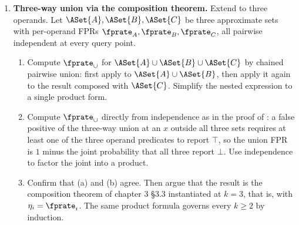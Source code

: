 \begin{enumerate}
\item \exstarstarstar
\label{ex:ch6-9}
\textbf{Three-way union via the composition theorem.}
Extend  to three operands. Let $\ASet{A},
\ASet{B}, \ASet{C}$ be three approximate sets with per-operand FPRs
$\fprate_A, \fprate_B, \fprate_C$, all pairwise independent at every
query point.
\begin{enumerate}
  \item[(a)] Compute $\fprate_{\cup}$ for $\ASet{A} \cup \ASet{B}
    \cup \ASet{C}$ by chained pairwise union: first apply
     to $\ASet{A} \cup \ASet{B}$, then apply it
    again to the result composed with $\ASet{C}$. Simplify the
    nested expression to a single product form.
  \item[(b)] Compute $\fprate_{\cup}$ directly from independence as
    in the proof of : a false positive of
    the three-way union at an $x$ outside all three sets requires at
    least one of the three operand predicates to report $\top$, so
    the union FPR is $1$ minus the joint probability that all three
    report $\bot$. Use independence to factor the joint into a
    product.
  \item[(c)] Confirm that (a) and (b) agree. Then argue that the
    result is the composition theorem  of
    chapter 3 §3.3 instantiated at $k = 3$, that is,
     with $\eta_i = \fprate_i$. The
    same product formula governs every $k \ge 2$ by induction.
\end{enumerate}


\end{enumerate}
